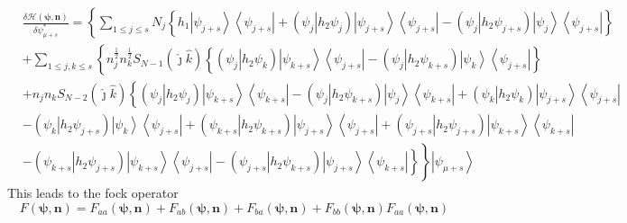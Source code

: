 \documentclass[aps,preprint]{revtex4}%
\begin{document}
\begin{align}
&  \frac{\delta\mathcal{H}\left(  \mathbf{\psi,n}\right)  }{\delta\psi_{\mu
+s}^{\ast}}=\left\{  \sum_{1\leq j\leq s}N_{j}\left\{  h_{1}\left\vert
\psi_{j+s}\right\rangle \left\langle \psi_{j+s}\right\vert +\left(  \left.
\psi_{j}\right\vert h_{2}\psi_{j}\right)  \left\vert \psi_{j+s}\right\rangle
\left\langle \psi_{j+s}\right\vert -\left(  \left.  \psi_{j}\right\vert
h_{2}\psi_{j+s}\right)  \left\vert \psi_{j}\right\rangle \left\langle
\psi_{j+s}\right\vert \right\}  \right. \nonumber\\
&  +\sum_{1\leq j,k\leq s}\left\{  n_{j}^{\frac{1}{2}}n_{k}^{\frac{1}{2}%
}S_{N-1}\left(  \hat{\jmath}\hat{k}\right)  \left\{  \left(  \left.  \psi
_{j}\right\vert h_{2}\psi_{k}\right)  \left\vert \psi_{k+s}\right\rangle
\left\langle \psi_{j+s}\right\vert -\left(  \left.  \psi_{j}\right\vert
h_{2}\psi_{k+s}\right)  \left\vert \psi_{k}\right\rangle \left\langle
\psi_{j+s}\right\vert \right\}  \right. \nonumber\\
&  +n_{j}n_{k}S_{N-2}\left(  \hat{\jmath}\hat{k}\right)  \left\{  \left(
\left.  \psi_{j}\right\vert h_{2}\psi_{j}\right)  \left\vert \psi
_{k+s}\right\rangle \left\langle \psi_{k+s}\right\vert -\left(  \left.
\psi_{j}\right\vert h_{2}\psi_{k+s}\right)  \left\vert \psi_{j}\right\rangle
\left\langle \psi_{k+s}\right\vert +\left(  \left.  \psi_{k}\right\vert
h_{2}\psi_{k}\right)  \left\vert \psi_{j+s}\right\rangle \left\langle
\psi_{j+s}\right\vert \right. \nonumber\\
&  -\left(  \left.  \psi_{k}\right\vert h_{2}\psi_{j+s}\right)  \left\vert
\psi_{k}\right\rangle \left\langle \psi_{j+s}\right\vert +\left(  \left.
\psi_{k+s}\right\vert h_{2}\psi_{k+s}\right)  \left\vert \psi_{j+s}%
\right\rangle \left\langle \psi_{j+s}\right\vert +\left(  \left.  \psi
_{j+s}\right\vert h_{2}\psi_{j+s}\right)  \left\vert \psi_{k+s}\right\rangle
\left\langle \psi_{k+s}\right\vert \nonumber\\
&  \left.  \overset{}{\left.  -\left(  \left.  \psi_{k+s}\right\vert h_{2}%
\psi_{j+s}\right)  \left\vert \psi_{k+s}\right\rangle \left\langle \psi
_{j+s}\right\vert -\left(  \left.  \psi_{j+s}\right\vert h_{2}\psi
_{k+s}\right)  \left\vert \psi_{j+s}\right\rangle \left\langle \psi
_{k+s}\right\vert \right\}  }\right\}  \left\vert \psi_{\mu+s}\right\rangle
\end{align}
This leads to the fock operator
\begin{equation}
F\left(  \mathbf{\psi,n}\right)  =F_{aa}\left(  \mathbf{\psi,n}\right)
+F_{ab}\left(  \mathbf{\psi,n}\right)  +F_{ba}\left(  \mathbf{\psi,n}\right)
+F_{bb}\left(  \mathbf{\psi,n}\right)  F_{aa}\left(  \mathbf{\psi,n}\right)
\end{equation}
\end{document}
